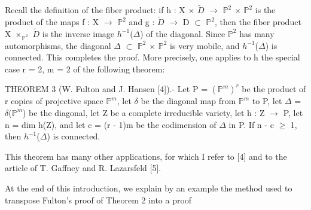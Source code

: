 \documentclass[10pt,a4paper]{article}
\begin{document}
\begin{adjustbox}{max totalsize={\textwidth}{0.945\textheight},center}
\begin{minipage}{\textwidth}
\noindent Recall the definition of the fiber product: if h : X \ensuremath{×} \ensuremath{\widetilde{D}} \ensuremath{→} \ensuremath{ℙ^2} \ensuremath{×} \ensuremath{ℙ^2} is the product of the maps f : X \ensuremath{→} \ensuremath{ℙ^2} and g : \ensuremath{\widetilde{D}} \ensuremath{→} D \ensuremath{⊂} \ensuremath{ℙ^2}, then the fiber product X \ensuremath{×_{ℙ^2}} \ensuremath{\widetilde{D}} is the inverse image \ensuremath{h^{-1}}(\ensuremath{Δ}) of the diagonal. Since \ensuremath{ℙ^2} has many automorphisms, the diagonal \ensuremath{Δ} \ensuremath{⊂} \ensuremath{ℙ^2} \ensuremath{×} \ensuremath{ℙ^2} is very mobile, and \ensuremath{h^{-1}}(\ensuremath{Δ}) is connected. This completes the proof. More precisely, one applies to h the special case r = 2, m = 2 of the following theorem:\par\smallskip
\noindent THEOREM 3 (W. Fulton and J. Hansen [4]).- Let P = \ensuremath{(ℙ^m)^r} be the product of r copies of projective space \ensuremath{ℙ^m}, let \ensuremath{δ} be the diagonal map from \ensuremath{ℙ^m} to P, let \ensuremath{Δ} = \ensuremath{δ}(\ensuremath{ℙ^m}) be the diagonal, let Z be a complete irreducible variety, let h : Z \ensuremath{→} P, let n = dim h(Z), and let c = (r - 1)m be the codimension of \ensuremath{Δ} in P. If n - c \ensuremath{≥} 1, then \ensuremath{h^{-1}}(\ensuremath{Δ}) is connected.\par\smallskip
\noindent This theorem has many other applications, for which I refer to [4] and to the article of T. Gaffney and R. Lazarsfeld [5].\par\smallskip
\noindent At the end of this introduction, we explain by an example the method used to transpose Fulton's proof of Theorem 2 into a proof\par\smallskip
\end{minipage}
\end{adjustbox}
\newpage
\end{document}
